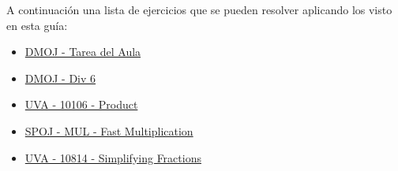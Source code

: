 A continuación una lista de ejercicios que se pueden resolver aplicando los visto en esta guía:

\begin{itemize}
	\item \href{https://dmoj.uclv.edu.cu/problem/buka}{DMOJ - Tarea del Aula}
	\item \href{https://dmoj.uclv.edu.cu/problem/div6}{DMOJ - Div 6}
	\item \href{https://onlinejudge.org/index.php?option=com_onlinejudge&Itemid=8&page=show_problem&problem=1047}{UVA - 10106 - Product}
	\item \href{https://www.spoj.com/problems/MUL/en/}{SPOJ - MUL - Fast Multiplication}
	\item \href{https://onlinejudge.org/index.php?option=com_onlinejudge&Itemid=8&page=show_problem&problem=1755}{UVA - 10814 - Simplifying Fractions}
\end{itemize}